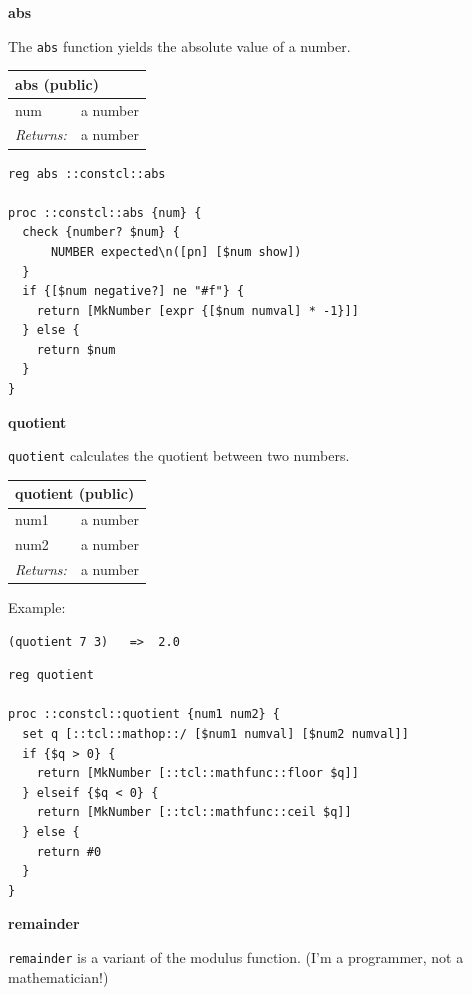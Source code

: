 \documentclass[twoside,9pt]{report}
\begin{document}
\textbf{abs}


The \texttt{abs} function yields the absolute value of a number.

\begin{tabular}{ |l l| }
\hline
\multicolumn{2}{|l|}{abs (public)} \\
\hline
num & a number \\
\textit{Returns:} & a number \\
\hline
\end{tabular}

\noindent\makebox[\linewidth]{\rule{\linewidth}{0.4pt}}
\begin{lstlisting}
reg abs ::constcl::abs
 
proc ::constcl::abs {num} {
  check {number? $num} {
      NUMBER expected\n([pn] [$num show])
  }
  if {[$num negative?] ne "#f"} {
    return [MkNumber [expr {[$num numval] * -1}]]
  } else {
    return $num
  }
}
\end{lstlisting}
\noindent\makebox[\linewidth]{\rule{\linewidth}{0.4pt}}

\textbf{quotient}


\texttt{quotient} calculates the quotient between two numbers.

\begin{tabular}{ |l l| }
\hline
\multicolumn{2}{|l|}{quotient (public)} \\
\hline
num1 & a number \\
num2 & a number \\
\textit{Returns:} & a number \\
\hline
\end{tabular}


Example:

\noindent\makebox[\linewidth]{\rule{\linewidth}{0.4pt}}
\begin{lstlisting}
(quotient 7 3)   =>  2.0
\end{lstlisting}
\noindent\makebox[\linewidth]{\rule{\linewidth}{0.4pt}}
\noindent\makebox[\linewidth]{\rule{\linewidth}{0.4pt}}
\begin{lstlisting}
reg quotient
 
proc ::constcl::quotient {num1 num2} {
  set q [::tcl::mathop::/ [$num1 numval] [$num2 numval]]
  if {$q > 0} {
    return [MkNumber [::tcl::mathfunc::floor $q]]
  } elseif {$q < 0} {
    return [MkNumber [::tcl::mathfunc::ceil $q]]
  } else {
    return #0
  }
}
\end{lstlisting}
\noindent\makebox[\linewidth]{\rule{\linewidth}{0.4pt}}

\textbf{remainder}


\texttt{remainder} is a variant of the modulus function. (I'm a programmer, not a mathematician!)
\end{document}
